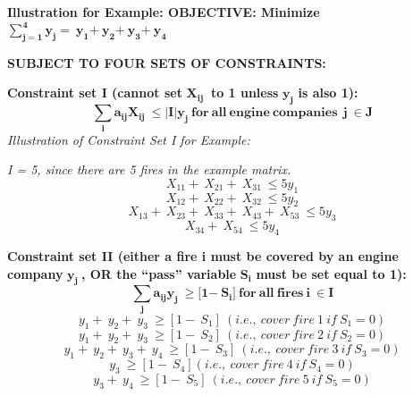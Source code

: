 \documentclass{article} %
\begin{document}
\noindent \textbf{Illustration for Example: OBJECTIVE:  Minimize }$\sum^{\boldsymbol{4}}_{\boldsymbol{j}\boldsymbol{=}\boldsymbol{1}}{{\boldsymbol{y}}_{\boldsymbol{j}}}\boldsymbol{=\ }{\boldsymbol{y}}_{\boldsymbol{1}}\boldsymbol{+\ }{\boldsymbol{y}}_{\boldsymbol{2}}\boldsymbol{+\ }{\boldsymbol{y}}_{\boldsymbol{3}}\boldsymbol{+\ }{\boldsymbol{y}}_{\boldsymbol{4}}$

\noindent \textbf{SUBJECT TO FOUR SETS OF CONSTRAINTS:}

\noindent \textbf{Constraint set I (cannot set }${\boldsymbol{X}}_{\boldsymbol{ij}}\boldsymbol{\ }$\textbf{ to 1 unless }${\boldsymbol{y}}_{\boldsymbol{j}}$\textbf{ is also 1):}
\[\sum_{\boldsymbol{i}}{{\boldsymbol{a}}_{\boldsymbol{ij}}{\boldsymbol{X}}_{\boldsymbol{ij}}\boldsymbol{\ }\boldsymbol{\le }\boldsymbol{|}\boldsymbol{I}\boldsymbol{|}{\boldsymbol{y}}_{\boldsymbol{j}}}\boldsymbol{\ }\boldsymbol{for}\boldsymbol{\ }\boldsymbol{all}\boldsymbol{\ }\boldsymbol{engine}\boldsymbol{\ }\boldsymbol{companies}\boldsymbol{\ \ }\boldsymbol{j}\boldsymbol{\ }\boldsymbol{\in }\boldsymbol{J}\] 
\textit{Illustration of Constraint Set I for Example:}

\noindent \textit{{\textbar}I{\textbar} = 5, since there are 5 fires in the example matrix.}
\[X_{11}+\ X_{21}+\ X_{31}\ \le 5y_1\] 
\[X_{12}+\ X_{22}+\ X_{32}\ \le 5y_2\] 
\[X_{13}+\ X_{23}+\ X_{33}+\ X_{43}+\ X_{53}\ \le 5y_3\] 
\[X_{34}+\ X_{54}\ \le 5y_4\] 
\textbf{}

\noindent \textbf{Constraint set II (either a fire i must be covered by an engine company }${\boldsymbol{y}}_{\boldsymbol{j}}\boldsymbol{\ }$\textbf{, OR the ``pass'' variable  }${\boldsymbol{S}}_{\boldsymbol{i}}$\textbf{ must be set equal to 1):}
\[\sum_{\boldsymbol{j}}{{\boldsymbol{a}}_{\boldsymbol{ij}}{\boldsymbol{y}}_{\boldsymbol{j}}\boldsymbol{\ }\boldsymbol{\ge }\boldsymbol{[}\boldsymbol{1}\boldsymbol{-}\boldsymbol{\ }{\boldsymbol{S}}_{\boldsymbol{i}}\boldsymbol{]}}\boldsymbol{\ }\boldsymbol{for}\boldsymbol{\ }\boldsymbol{all}\boldsymbol{\ }\boldsymbol{fires}\boldsymbol{\ }\boldsymbol{i}\boldsymbol{\ }\boldsymbol{\in }\boldsymbol{I}\] 
\[y_1+\ y_2+\ y_3\ \ge \left[1-\ S_1\right]\ (i.e.,\ cover\ fire\ 1\ if\ S_1=0)\] 
\[y_1+\ y_2+\ y_3\ \ge \left[1-\ S_2\right]\ (i.e.,\ cover\ fire\ 2\ if\ S_2=0)\] 
\[y_1+\ y_2+\ y_3+\ y_4\ \ge \left[1-\ S_3\right]\ (i.e.,\ cover\ fire\ 3\ if\ S_3=0)\] 
\[y_3\ \ge \left[1-\ S_4\right](i.e.,\ cover\ fire\ 4\ if\ S_4=0)\] 
\[y_3+\ y_4\ \ge \left[1-\ S_5\right]\ (i.e.,\ cover\ fire\ 5\ if\ S_5=0)\] 
\textbf{}
\end{document}

